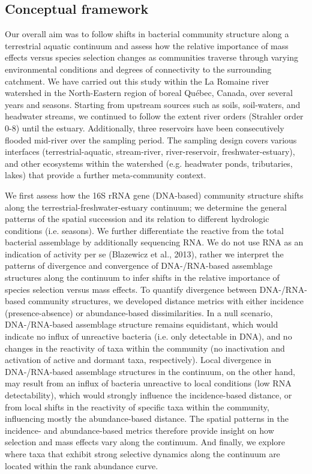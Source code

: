 \documentclass[12pt,a4paper]{article} %
\begin{document}
\subsection*{Conceptual framework}
Our overall aim was to follow shifts in bacterial community structure along a terrestrial aquatic continuum and assess how the relative importance of mass effects versus species selection changes as communities traverse through varying environmental conditions and degrees of connectivity to the surrounding catchment. We have carried out this study within the La Romaine river watershed in the North-Eastern region of boreal Québec, Canada, over several years and seasons. Starting from upstream sources such as soils, soil-waters, and headwater streams, we continued to follow the extent river orders (Strahler order 0-8) until the estuary. Additionally, three reservoirs have been consecutively flooded mid-river over the sampling period. The sampling design covers various interfaces (terrestrial-aquatic, stream-river, river-reservoir, freshwater-estuary), and other ecosystems within the watershed (e.g. headwater ponds, tributaries, lakes) that provide a further meta-community context.

We first assess how the 16S rRNA gene (DNA-based) community structure shifts along the terrestrial-freshwater-estuary continuum; we determine the general patterns of the spatial succession and its relation to different hydrologic conditions (i.e. seasons). We further differentiate the reactive from the total bacterial assemblage by additionally sequencing RNA. We do not use RNA as an indication of activity per se (Blazewicz et al., 2013), rather we interpret the patterns of divergence and convergence of DNA-/RNA-based assemblage structures along the continuum to infer shifts in the relative importance of species selection versus mass effects. To quantify divergence between DNA-/RNA-based community structures, we developed distance metrics with either incidence (presence-absence) or abundance-based dissimilarities. In a null scenario, DNA-/RNA-based assemblage structure remains equidistant, which would indicate no influx of unreactive bacteria (i.e. only detectable in DNA), and no changes in the reactivity of taxa within the community (no inactivation and activation of active and dormant taxa, respectively). Local divergence in DNA-/RNA-based assemblage structures in the continuum, on the other hand, may result from an influx of bacteria unreactive to local conditions (low RNA detectability), which would strongly influence the incidence-based distance, or from local shifts in the reactivity of specific taxa within the community, influencing mostly the abundance-based distance. The spatial patterns in the incidence- and abundance-based metrics therefore provide insight on how selection and mass effects vary along the continuum. And finally, we explore where taxa that exhibit strong selective dynamics along the continuum are located within the rank abundance curve.
\end{document}
